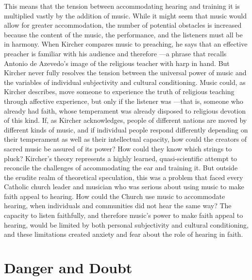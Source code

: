 This means that the tension between accommodating hearing and training it is
multiplied vastly by the addition of music.
While it might seem that music would allow for greater accommodation, the number
of potential obstacles is increased because the content of the music, the
performance, and the listeners must all be in harmony.
When Kircher compares music to preaching, he says that an effective preacher is
familiar with his audience and therefore ---a phrase that recalls Antonio de Azevedo's image of the religious
teacher with harp in hand.%
    \Autocite
    [551: .]
    {Kircher:Musurgia}
But Kircher never fully resolves the tension between the universal power of
music and the variables of individual subjectivity and cultural conditioning.
Music could, as Kircher describes, move someone to experience the truth of
religious teaching through affective experience, but only if the listener was
---that is, someone who already
had faith, whose temperament was already disposed to religious devotion of this
kind.
If, as Kircher acknowledges, people of different nations are moved by different
kinds of music, and if individual people respond differently depending on their
temperament as well as their intellectual capacity, how could the creators of
sacred music be assured of its power?
How could they know which strings to pluck?
Kircher's theory represents a highly learned, quasi-scientific attempt
to reconcile the challenges of accommodating the ear and training it.
But outside the erudite realm of theoretical speculation, this was a problem
that faced every Catholic church leader and musician who was serious about using
music to make faith appeal to hearing.
How could the Church use music to accommodate hearing, when individuals and
communities did not hear the same way?
The capacity to listen faithfully, and therefore music's power to make faith
appeal to hearing, would be limited by both personal subjectivity and cultural
conditioning, and these limitations created anxiety and fear about the role of
hearing in faith.


\section{Danger and Doubt}

